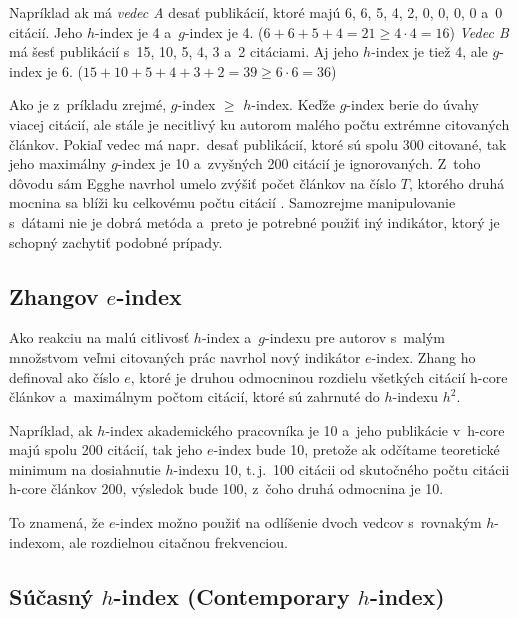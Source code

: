 Napríklad ak má \emph{vedec A} desať publikácií, ktoré majú 6, 6, 5, 4, 2, 0, 0,
0, 0 a~0 citácií.  Jeho $h$-index je 4 a~$g$-index je 4.
($6+6+5+4 = 21 \geq 4\cdot4=16$) \emph{Vedec B} má šesť publikácií s~15, 10, 5,
4, 3 a~2 citáciami.  Aj jeho $h$-index je tiež 4, ale $g$-index je 6.
($15+10+5+4+3+2 = 39 \geq 6\cdot6 = 36$)

Ako je z~príkladu zrejmé, $g$-index $\geq$ $h$-index.  Keďže $g$-index berie do
úvahy viacej citácií, ale stále je necitlivý ku autorom malého počtu extrémne
citovaných článkov.  Pokiaľ vedec má napr.~desať publikácií, ktoré sú spolu 300
citované, tak jeho maximálny $g$-index je 10 a~zvyšných 200 citácií je
ignorovaných.  Z~toho dôvodu sám Egghe navrhol umelo zvýšiť počet článkov na
číslo $T$, ktorého druhá mocnina sa blíži ku celkovému počtu citácií
\citep{Egghe2006}.  Samozrejme manipulovanie s~dátami nie je dobrá metóda
a~preto je potrebné použiť iný indikátor, ktorý je schopný zachytiť podobné
prípady.


\subsection{Zhangov $e$-index}
\label{sec:e-index}

Ako reakciu na malú citlivosť $h$-index a~$g$-indexu pre autorov s~malým
množstvom veľmi citovaných prác \citet{Zhang2009} navrhol nový indikátor
$e$-index.  Zhang ho definoval ako číslo $e$, ktoré je druhou odmocninou
rozdielu všetkých citácií h-core článkov a~maximálnym počtom citácií, ktoré sú
zahrnuté do $h$-indexu $h^2$.

Napríklad, ak $h$-index akademického pracovníka je 10 a~jeho publikácie v~h-core
majú spolu 200 citácií, tak jeho $e$-index bude 10, pretože ak odčítame
teoretické minimum na dosiahnutie $h$-indexu 10, t.\,j.~100 citácii od
skutočného počtu citácii h-core článkov 200, výsledok bude 100, z~čoho druhá
odmocnina je 10.

To znamená, že $e$-index možno použiť na odlíšenie dvoch vedcov s~rovnakým
$h$-indexom, ale rozdielnou citačnou frekvenciou.


\subsection{Súčasný $h$-index (Contemporary $h$-index)}
\label{sec:hc-index}

